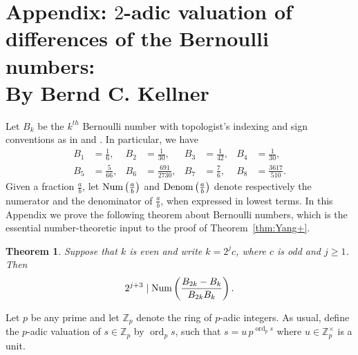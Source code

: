 \documentclass[12pt]{amsart}
\newcommand\Z{\mathbb{Z}}
\newcommand\Num{\textup{Num}}
\newcommand\Denom{\textup{Denom}}
\DeclareMathOperator{\ord}{ord}
\newtheorem{Theorem}{Theorem}[section]
\theoremstyle{remark}
\newcommand{\dccomm}[1]{\begingroup\color{blue}DC:~#1\endgroup}
\newcommand{\ascomm}[1]{\begingroup\color{red}AS:~#1\endgroup}
\newcommand{\bkcomm}[1]{\begingroup\color{magenta}BK:~#1\endgroup}
\begin{document}
\begin{comment}
\dccomm{I have more detailed proof of this in an email to AS, which we can include
if you like the result.}
\ascomm{I added some of the e-mail, without editing yet}

\ascomm{Shall we move Subsection 6.8 here? }
\end{proof}

\end{comment}



\appendix
\section*{Appendix: $2$-adic valuation of differences of the Bernoulli numbers:\\ 
By Bernd C. Kellner}
\label{sec:bernoulli}
\setcounter{section}{1}
\setcounter{Theorem}{0}


Let $B_k$ be the $k^{th}$ Bernoulli number with topologist's indexing and sign
conventions as in \cite[p.\,12]{Hirzebruch66} and
\cite[Appendix B]{Milnor&Stasheff74}. In particular, we have
%
\[
  \begin{aligned}
      B_1 & = \frac{1}{6},  & B_2 & = \frac{1}{30},     & B_3 & = \frac{1}{42},
    & B_4 & = \frac{1}{30}, \\
      B_5 & = \frac{5}{66}, & B_6 & = \frac{691}{2730}, & B_7 & = \frac{7}{6},
    & B_8 & = \frac{3617}{510}.
  \end{aligned}
\]
%
Given a fraction $\frac{a}{b}$, let $\Num \left( \frac{a}{b} \right)$ and
$\Denom \left( \frac{a}{b} \right)$ denote respectively the numerator and the
denominator of $\frac{a}{b}$, when expressed in lowest terms. In this Appendix
we prove the following theorem about Bernoulli numbers, which is the essential
number-theoretic input to the proof of Theorem~\ref{thm:Yang+}.

\begin{Theorem} \label{thm:bernoulli}
Suppose that $k$ is even and write $k = 2^j c$,
where $c$ is odd and $j \geq 1$. Then
%
\[
  2^{j+3} \mid \Num \left( \frac{B_{2k} - B_k}{B_{2k}B_k} \right).
\]
%
\end{Theorem}


Let $p$ be any prime and let $\Z_p$ denote the ring of $p$-adic integers. As usual, define the $p$-adic valuation of $s \in \Z_p$ by $\ord_p s$,
such that $s = u \, p^{\ord_p s}$ where $u \in \Z_p^\times$ is a unit.
\end{document}
